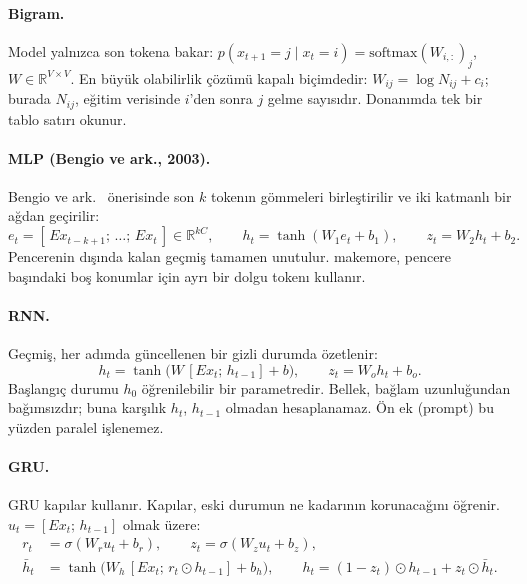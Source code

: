 \paragraph{Bigram.} Model yalnızca son tokena bakar: $p(x_{t+1} = j \mid x_t = i) = \mathrm{softmax}(W_{i,:})_j$, $W\in\mathbb{R}^{V\times V}$. En büyük olabilirlik çözümü kapalı biçimdedir: $W_{ij} = \log N_{ij} + c_i$; burada $N_{ij}$, eğitim verisinde $i$'den sonra $j$ gelme sayısıdır. Donanımda tek bir tablo satırı okunur.

\paragraph{MLP (Bengio ve ark., 2003).} Bengio ve ark.\ \cite{bengio03} önerisinde son $k$ tokenın gömmeleri birleştirilir ve iki katmanlı bir ağdan geçirilir:
\begin{equation}
  e_t = [\,E x_{t-k+1};\, \dots;\, E x_t\,] \in \mathbb{R}^{kC}, \qquad h_t = \tanh(W_1 e_t + b_1), \qquad z_t = W_2 h_t + b_2 .
\end{equation}
Pencerenin dışında kalan geçmiş tamamen unutulur. makemore, pencere başındaki boş konumlar için ayrı bir dolgu tokenı kullanır.

\paragraph{RNN.} Geçmiş, her adımda güncellenen bir gizli durumda özetlenir:
\begin{equation}
  h_t = \tanh\!\big(W\,[E x_t;\, h_{t-1}] + b\big), \qquad z_t = W_o h_t + b_o .
\end{equation}
Başlangıç durumu $h_0$ öğrenilebilir bir parametredir. Bellek, bağlam uzunluğundan bağımsızdır; buna karşılık $h_t$, $h_{t-1}$ olmadan hesaplanamaz. Ön ek (prompt) bu yüzden paralel işlenemez.

\paragraph{GRU.} GRU \cite{gru} kapılar kullanır. Kapılar, eski durumun ne kadarının korunacağını öğrenir. $u_t = [E x_t;\, h_{t-1}]$ olmak üzere:
\begin{equation}
\begin{aligned}
  r_t &= \sigma(W_r u_t + b_r), \qquad z_t = \sigma(W_z u_t + b_z), \\
  \bar h_t &= \tanh\!\big(W_h\,[E x_t;\, r_t \odot h_{t-1}] + b_h\big), \qquad
  h_t = (1 - z_t) \odot h_{t-1} + z_t \odot \bar h_t .
\end{aligned}
\end{equation}

